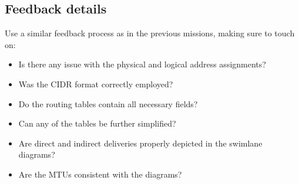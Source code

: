 \subsection*{Feedback details}

Use a similar feedback process as in the previous missions, making sure to touch on:
\begin{itemize}
\item Is there any issue with the physical and logical address assignments?\\[-0.5cm]
\item Was the CIDR format correctly employed?\\[-0.5cm]
\item Do the routing tables contain all necessary fields?\\[-0.5cm]
\item Can any of the tables be further simplified?\\[-0.5cm]
\item Are direct and indirect deliveries properly depicted in the swimlane diagrams?\\[-0.5cm]
\item Are the MTUs consistent with the diagrams?
\end{itemize}
